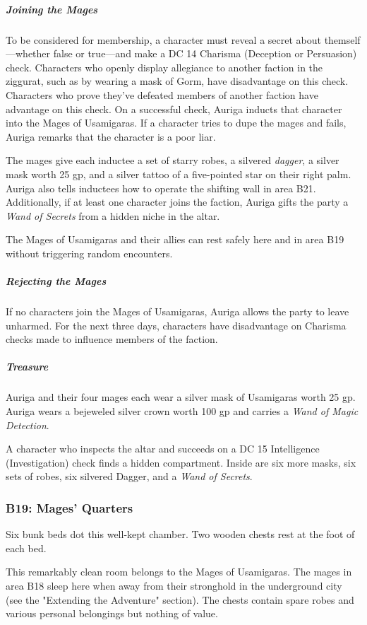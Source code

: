 \documentclass[10pt,a4paper,twoside,bg=print,twocolumn,openany,nodeprecatedcode]{dndbook}
\begin{document}
\subparagraph{Joining the Mages}
To be considered for membership, a character must reveal a secret about themself—whether false or true—and make a DC 14 Charisma (Deception or Persuasion) check. Characters who openly display allegiance to another faction in the ziggurat, such as by wearing a mask of Gorm, have disadvantage on this check. Characters who prove they've defeated members of another faction have advantage on this check. On a successful check, Auriga inducts that character into the Mages of Usamigaras. If a character tries to dupe the mages and fails, Auriga remarks that the character is a poor liar.

The mages give each inductee a set of starry robes, a silvered \textit{dagger}, a silver mask worth 25 gp, and a silver tattoo of a five-pointed star on their right palm. Auriga also tells inductees how to operate the shifting wall in area B21. Additionally, if at least one character joins the faction, Auriga gifts the party a \textit{Wand of Secrets} from a hidden niche in the altar.

The Mages of Usamigaras and their allies can rest safely here and in area B19 without triggering random encounters.

\subparagraph{Rejecting the Mages}
If no characters join the Mages of Usamigaras, Auriga allows the party to leave unharmed. For the next three days, characters have disadvantage on Charisma checks made to influence members of the faction.

\subparagraph{Treasure}
Auriga and their four mages each wear a silver mask of Usamigaras worth 25 gp. Auriga wears a bejeweled silver crown worth 100 gp and carries a \textit{Wand of Magic Detection}.

A character who inspects the altar and succeeds on a DC 15 Intelligence (Investigation) check finds a hidden compartment. Inside are six more masks, six sets of robes, six silvered Dagger, and a \textit{Wand of Secrets}.

\subsubsection{B19: Mages' Quarters}
\begin{DndReadAloud}{}
Six bunk beds dot this well-kept chamber. Two wooden chests rest at the foot of each bed.

\end{DndReadAloud}

This remarkably clean room belongs to the Mages of Usamigaras. The mages in area B18 sleep here when away from their stronghold in the underground city (see the "Extending the Adventure" section). The chests contain spare robes and various personal belongings but nothing of value.
\end{document}
